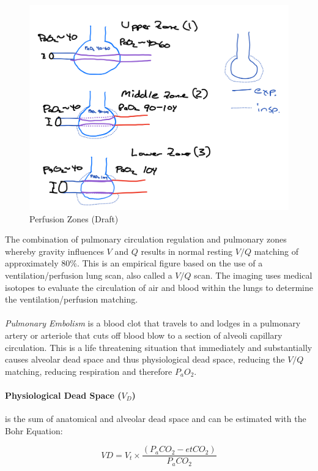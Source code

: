 \begin{figure}[!h]
    \centering
    \includegraphics[width=0.75 \linewidth]{./figure/ventilation/perfusion_zones.png}
    \caption{Perfusion Zones (Draft)}
    \label{fig:perfusion_zones}
\end{figure}

The combination of pulmonary circulation regulation and pulmonary zones whereby gravity influences $V$ and $Q$ results in normal resting $V/Q$ matching of approximately 80\%. This is an empirical figure based on the use of a ventilation/perfusion lung scan, also called a $V/Q$ scan.  The imaging uses medical isotopes to evaluate the circulation of air and blood within the lungs to determine the ventilation/perfusion matching. 

\paragraph{} \textit{Pulmonary Embolism} is a blood clot that travels to and lodges in a pulmonary artery or arteriole that cuts off blood blow to a section of alveoli capillary circulation. This is a life threatening situation that immediately and substantially causes alveolar dead space and thus physiological dead space, reducing the $V/Q$ matching, reducing respiration and therefore $P_aO_2$.


\paragraph{Physiological Dead Space ($V_D$)} is the sum of anatomical and alveolar dead space and can be estimated with the Bohr Equation:

\begin{equation}
    VD = V_t \times \frac{(P_aCO_2 - etCO_2)}{P_aCO_2}
    \label{eq:bohr}
 \end{equation}
 
